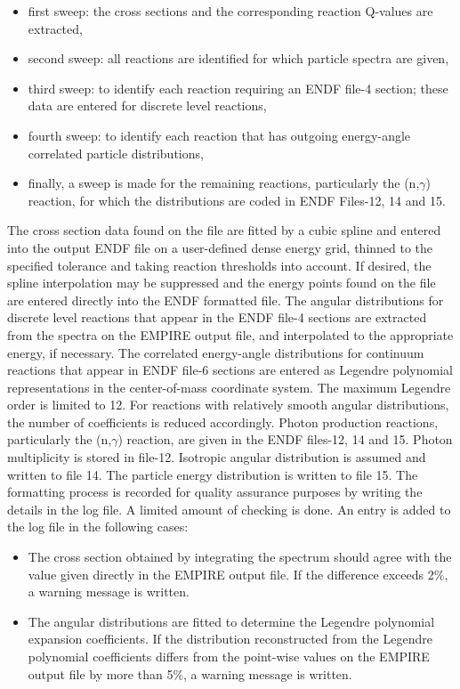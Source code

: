 \begin{itemize}
\item first sweep: the cross sections and the corresponding reaction
Q-values are extracted,

\item second sweep: all reactions are identified for which particle spectra
are given,

\item third sweep: to identify each reaction requiring an ENDF file-4
section; these data are entered for discrete level reactions,

\item fourth sweep: to identify each reaction that has outgoing energy-angle
correlated particle distributions,

\item finally, a sweep is made for the remaining reactions, particularly the
(n,$\gamma$) reaction, for which the distributions are coded in ENDF
Files-12, 14 and 15.
\end{itemize}

The cross section data found on the file are fitted by a cubic spline and
entered into the output ENDF file on a user-defined dense energy grid,
thinned to the specified tolerance and taking reaction thresholds into
account. If desired, the spline interpolation may be suppressed and the
energy points found on the file are entered directly into the ENDF formatted
file. The angular distributions for discrete level reactions that appear in
the ENDF file-4 sections are extracted from the spectra on the EMPIRE output
file, and interpolated to the appropriate energy, if necessary. The
correlated energy-angle distributions for continuum reactions that appear in
ENDF file-6 sections are entered as Legendre polynomial representations in
the center-of-mass coordinate system. The maximum Legendre order is limited
to 12. For reactions with relatively smooth angular distributions, the
number of coefficients is reduced accordingly. Photon production reactions,
particularly the (n,$\gamma$) reaction, are given in the ENDF files-12, 14
and 15. Photon multiplicity is stored in file-12. Isotropic angular
distribution is assumed and written to file 14. The particle energy
distribution is written to file 15. The formatting process is recorded for
quality assurance purposes by writing the details in the log file. A limited
amount of checking is done. An entry is added to the log file in the
following cases:

\begin{itemize}
\item The cross section obtained by integrating the spectrum should agree
with the value given directly in the EMPIRE output file. If the difference
exceeds 2\%, a warning message is written.

\item The angular distributions are fitted to determine the Legendre
polynomial expansion coefficients. If the distribution reconstructed from
the Legendre polynomial coefficients differs from the point-wise values on
the EMPIRE output file by more than 5\%, a warning message is written.
\end{itemize}

